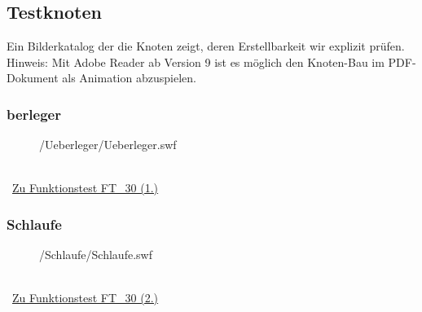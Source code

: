 %



\newpage





\subsection{Testknoten}

Ein Bilderkatalog der die Knoten zeigt, deren Erstellbarkeit wir explizit prüfen. Hinweis: Mit Adobe Reader ab Version 9 ist es möglich den Knoten-Bau im PDF-Dokument als Animation abzuspielen.\\


	\subsubsection*{berleger\grqq}
	
		\begin{figure}[!h]
		
			\label{Abb:Test-Knoten:Ueberleger}
			\centering	
			
			{\KnotMedia/Ueberleger/Ueberleger.swf}
			
		\end{figure}
		
		~\\\mousecursor~\hyperref[FT:30:Ueberleger]{Zu Funktionstest FT\_30 (1.)} 
	
	

\clearpage	



	\subsubsection*{\glqq Schlaufe\grqq}	
	
		\begin{figure}[!h]
		
			\label{Abb:Test-Knoten:Schlaufe}
			\centering	
			
			{\KnotMedia/Schlaufe/Schlaufe.swf}
			
		\end{figure}
		
		~\\\mousecursor~\hyperref[FT:30:Schlaufe]{Zu Funktionstest FT\_30 (2.)} 
	
	

\clearpage	


